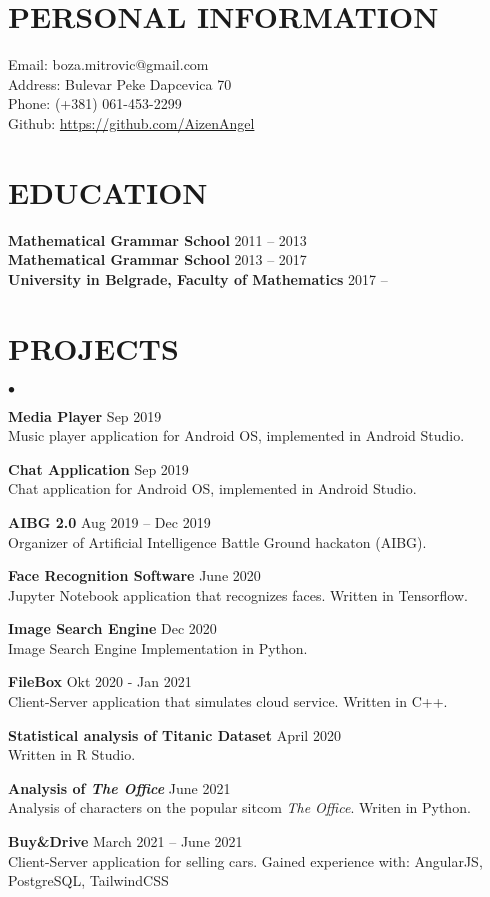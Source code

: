\documentclass[margin,center]{res}
\newenvironment{list2}{
  \begin{list}{$\bullet$}{%
      \setlength{\itemsep}{0in}
      \setlength{\parsep}{0in} \setlength{\parskip}{0in}
      \setlength{\topsep}{0in} \setlength{\partopsep}{0in}
      \setlength{\leftmargin}{0.2in}}}{\end{list}}
\begin{document}


\begin{resume}
\section{PERSONAL INFORMATION}
{ Email:    }   boza.mitrovic@gmail.com  \\ 
{ Address:} Bulevar Peke Dapcevica 70   \\  
{ Phone: }(+381) 061-453-2299  \\ 
{ Github: } \url{https://github.com/AizenAngel}


\section{EDUCATION}
{\bf Mathematical Grammar School} \hfill 2011 -- 2013\\
{\bf Mathematical Grammar School} \hfill 2013 -- 2017\\
{\bf University in Belgrade, Faculty of Mathematics}  \hfill 2017 -- 


\section{PROJECTS\\}
\begin{list2}
  \item{\bf Media Player} \hfill  Sep 2019\\
    Music player application for Android OS, implemented in Android Studio.
  \item{\bf Chat Application} \hfill Sep 2019\\
    Chat application for Android OS, implemented in Android Studio.
  \item{\bf AIBG 2.0} \hfill Aug 2019 -- Dec 2019 \\ 
    Organizer of Artificial Intelligence Battle Ground hackaton (AIBG).
  \item{\bf Face Recognition Software} \hfill June 2020\\
    Jupyter Notebook application that recognizes faces. Written in Tensorflow.
  \item{\bf Image Search Engine} \hfill Dec 2020 \\
    Image Search Engine Implementation in Python.
  \item{\bf FileBox}  \hfill Okt 2020 - Jan 2021\\
    Client-Server application that simulates cloud service. Written in C++.
  \item{\bf Statistical analysis of Titanic Dataset} \hfill April 2020\\
    Written in R Studio.
  \item{\bf Analysis of \emph{The Office}} \hfill June 2021 \\
    Analysis of characters on the popular sitcom \emph{The Office}. Writen in Python.
  \item{\bf Buy\&Drive} \hfill March 2021 -- June 2021 \\
    Client-Server application for selling cars. Gained experience with: AngularJS, PostgreSQL, TailwindCSS


\end{list2}
\end{resume}
\end{document}
